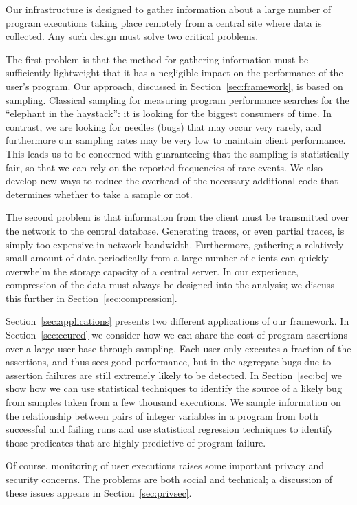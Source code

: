 Our infrastructure is designed to gather information about a large
number of program executions taking place remotely from a central site
where data is collected.  Any such design must solve two critical
problems.

The first problem is that the method for gathering information must be
sufficiently lightweight that it has a negligible impact on the
performance of the user's program.  Our approach, discussed in
Section~\ref{sec:framework}, is based on sampling.  Classical sampling
for measuring program performance searches for the ``elephant in the
haystack'': it is looking for the biggest consumers of time.  In
contrast, we are looking for needles (bugs) that may occur very
rarely, and furthermore our sampling rates may be very low to maintain
client performance.  This leads us to be concerned with guaranteeing
that the sampling is statistically fair, so that we can rely on the
reported frequencies of rare events.  We also develop new ways to
reduce the overhead of the necessary additional code that determines
whether to take a sample or not.

The second problem is that information from the client must be
transmitted over the network to the central database.  Generating
traces, or even partial traces, is simply too expensive in network
bandwidth.  Furthermore, gathering a relatively small amount of data
periodically from a large number of clients can quickly overwhelm the
storage capacity of a central server.  In our experience, compression
of the data must always be designed into the analysis; we discuss this
further in Section~\ref{sec:compression}.


Section~\ref{sec:applications} presents two different applications of
our framework.  In Section~\ref{sec:ccured} we consider how we can
share the cost of program assertions over a large user base through
sampling.  Each user only executes a fraction of the assertions, and
thus sees good performance, but in the aggregate bugs due to assertion
failures are still extremely likely to be detected.  In
Section~\ref{sec:bc} we show how we can use statistical techniques to
identify the source of a likely bug from samples taken from a few
thousand executions.  We sample information on the relationship
between pairs of integer variables in a program from both successful
and failing runs and use statistical regression techniques to identify
those predicates that are highly predictive of program failure.

Of course, monitoring of user executions raises some important privacy
and security concerns.  The problems are both social and technical; a
discussion of these issues appears in Section~\ref{sec:privsec}.

